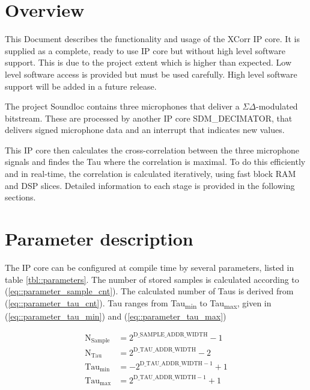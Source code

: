 


\maketitle

\section{Overview}
\label{sec:overview}

This Document describes the functionality and usage of the XCorr IP core.
It is supplied as a complete, ready to use IP core but without high level software support.
This is due to the project extent which is higher than expected.
Low level software access is provided but must be used carefully.
High level software support will be added in a future release.

The project Soundloc contains three microphones that deliver a $\Sigma\Delta$-modulated bitstream.
These are processed by another IP core SDM\_DECIMATOR, that delivers signed microphone data and an interrupt that indicates new values.

This IP core then calculates the cross-correlation between the three microphone signals and findes the Tau where the correlation is maximal.
To do this efficiently and in real-time, the correlation is calculated iteratively, using fast block RAM and DSP slices.
Detailed information to each stage is provided in the following sections.

\section{Parameter description}
\label{sec::parameters}

The IP core can be configured at compile time by several parameters, listed in table \ref{tbl::parameters}.
The number of stored samples is calculated according to (\ref{eq::parameter_sample_cnt}).
The calculated number of Taus is derived from (\ref{eq::parameter_tau_cnt}).
Tau ranges from Tau\textsubscript{min} to Tau\textsubscript{max}, given in (\ref{eq::parameter_tau_min}) and (\ref{eq::parameter_tau_max})

\begin{align}
	\text{N}_{\text{Sample}} &= 2^{\text{D\_SAMPLE\_ADDR\_WIDTH}}-1 \label{eq::parameter_sample_cnt} \\
	\text{N}_{\text{Tau}} &=2^{\text{D\_TAU\_ADDR\_WIDTH}}-2 \label{eq::parameter_tau_cnt} \\
	\text{Tau}_{\text{min}} &= -2^{\text{D\_TAU\_ADDR\_WIDTH} - 1}+1 \label{eq::parameter_tau_min} \\
	\text{Tau}_{\text{max}} &= 2^{\text{D\_TAU\_ADDR\_WIDTH} - 1}+1 \label{eq::parameter_tau_max}
\end{align}


